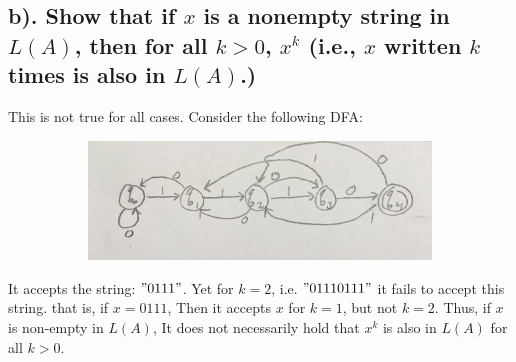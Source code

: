 \documentclass[20pt]{article} %
\begin{document}
\subsection{b). Show that if $x$ is a nonempty string in $L(A)$, then for all $k>0$, $x^{k}$ (i.e., $x$ written $k$ times is also in $L(A)$.)}

This is not true for all cases. Consider the following DFA: \\
\begin{figure}[!htbp]
  	\centering
   	\begin{subfigure}[p]{0.8\linewidth}
    	\includegraphics[width=\linewidth]{./figures/H1-4.jpg}
   	\end{subfigure}
\end{figure} 

It accepts the string: $"0111"$.  Yet for $k=2$, i.e. $"01110111"$ it fails to accept this string.  that is, if $x=0111$, Then it accepts $x$ for $k=1$, but not $k=2$. Thus, if $x$ is non-empty in $L(A)$, It does not necessarily hold that $x^{k}$ is also in $L(A)$ for all $k>0$.
\end{document}
